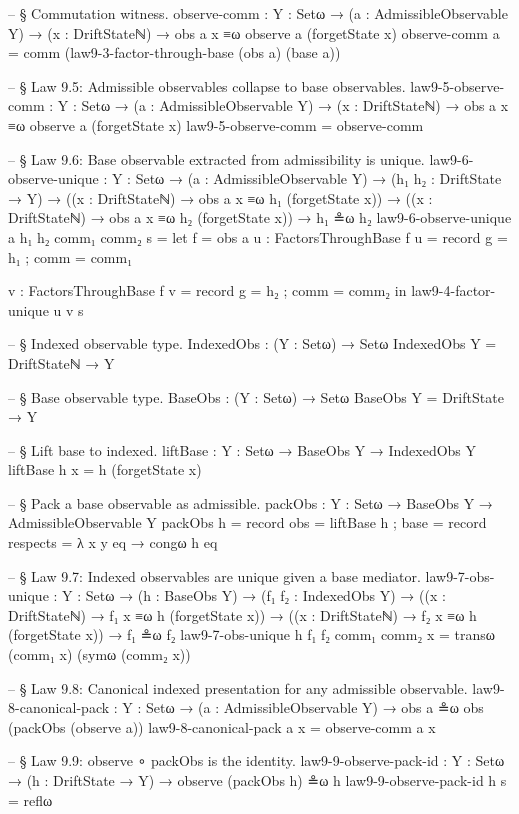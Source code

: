 \documentclass[11pt,a4paper]{book}
\begin{document}
\begin{code}
-- § Commutation witness.
observe-comm : {Y : Setω} → (a : AdmissibleObservable Y) → (x : DriftStateℕ) → obs a x ≡ω observe a (forgetState x)
observe-comm a = comm (law9-3-factor-through-base (obs a) (base a))

-- § Law 9.5: Admissible observables collapse to base observables.
law9-5-observe-comm : {Y : Setω} → (a : AdmissibleObservable Y) → (x : DriftStateℕ) → obs a x ≡ω observe a (forgetState x)
law9-5-observe-comm = observe-comm

-- § Law 9.6: Base observable extracted from admissibility is unique.
law9-6-observe-unique :
  {Y : Setω} →
  (a : AdmissibleObservable Y) →
  (h₁ h₂ : DriftState → Y) →
  ((x : DriftStateℕ) → obs a x ≡ω h₁ (forgetState x)) →
  ((x : DriftStateℕ) → obs a x ≡ω h₂ (forgetState x)) →
  h₁ ≗ω h₂
law9-6-observe-unique a h₁ h₂ comm₁ comm₂ s =
  let
    f = obs a
    u : FactorsThroughBase f
    u = record { g = h₁ ; comm = comm₁ }

    v : FactorsThroughBase f
    v = record { g = h₂ ; comm = comm₂ }
  in
  law9-4-factor-unique u v s

-- § Indexed observable type.
IndexedObs : (Y : Setω) → Setω
IndexedObs Y = DriftStateℕ → Y

-- § Base observable type.
BaseObs : (Y : Setω) → Setω
BaseObs Y = DriftState → Y

-- § Lift base to indexed.
liftBase : {Y : Setω} → BaseObs Y → IndexedObs Y
liftBase h x = h (forgetState x)

-- § Pack a base observable as admissible.
packObs : {Y : Setω} → BaseObs Y → AdmissibleObservable Y
packObs h = record
  { obs  = liftBase h
  ; base = record { respects = λ x y eq → congω h eq }
  }

-- § Law 9.7: Indexed observables are unique given a base mediator.
law9-7-obs-unique :
  {Y : Setω} →
  (h : BaseObs Y) →
  (f₁ f₂ : IndexedObs Y) →
  ((x : DriftStateℕ) → f₁ x ≡ω h (forgetState x)) →
  ((x : DriftStateℕ) → f₂ x ≡ω h (forgetState x)) →
  f₁ ≗ω f₂
law9-7-obs-unique h f₁ f₂ comm₁ comm₂ x =
  transω (comm₁ x) (symω (comm₂ x))

-- § Law 9.8: Canonical indexed presentation for any admissible observable.
law9-8-canonical-pack :
  {Y : Setω} →
  (a : AdmissibleObservable Y) →
  obs a ≗ω obs (packObs (observe a))
law9-8-canonical-pack a x = observe-comm a x

-- § Law 9.9: observe ∘ packObs is the identity.
law9-9-observe-pack-id :
  {Y : Setω} →
  (h : DriftState → Y) →
  observe (packObs h) ≗ω h
law9-9-observe-pack-id h s = reflω
\end{code}
\end{document}
